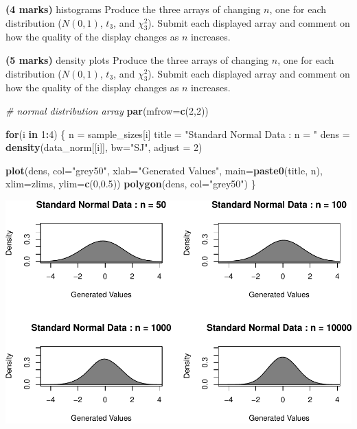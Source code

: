 \documentclass[9pt,letter]{article}
\newenvironment{Shaded}{\begin{snugshade}}{\end{snugshade}}
\newcommand{\KeywordTok}[1]{\textcolor[rgb]{0.13,0.29,0.53}{\textbf{#1}}}
\newcommand{\DataTypeTok}[1]{\textcolor[rgb]{0.13,0.29,0.53}{#1}}
\newcommand{\DecValTok}[1]{\textcolor[rgb]{0.00,0.00,0.81}{#1}}
\newcommand{\FloatTok}[1]{\textcolor[rgb]{0.00,0.00,0.81}{#1}}
\newcommand{\StringTok}[1]{\textcolor[rgb]{0.31,0.60,0.02}{#1}}
\newcommand{\CommentTok}[1]{\textcolor[rgb]{0.56,0.35,0.01}{\textit{#1}}}
\newcommand{\ControlFlowTok}[1]{\textcolor[rgb]{0.13,0.29,0.53}{\textbf{#1}}}
\newcommand{\OperatorTok}[1]{\textcolor[rgb]{0.81,0.36,0.00}{\textbf{#1}}}
\newcommand{\NormalTok}[1]{#1}
\begin{document}
\item 

\textbf{(4 marks)} histograms Produce the three arrays of changing
\(n\), one for each distribution (\(N(0,1)\), \(t_3\), and
\(\chi^2_3\)). Submit each displayed array and comment on how the
quality of the display changes as \(n\) increases.

\item 

\textbf{(5 marks)} density plots Produce the three arrays of changing
\(n\), one for each distribution (\(N(0,1)\), \(t_3\), and
\(\chi^2_3\)). Submit each displayed array and comment on how the
quality of the display changes as \(n\) increases.

\begin{Shaded}
\begin{Highlighting}[]
\CommentTok{# normal distribution array}
\KeywordTok{par}\NormalTok{(}\DataTypeTok{mfrow=}\KeywordTok{c}\NormalTok{(}\DecValTok{2}\NormalTok{,}\DecValTok{2}\NormalTok{))}

\ControlFlowTok{for}\NormalTok{(i }\ControlFlowTok{in} \DecValTok{1}\OperatorTok{:}\DecValTok{4}\NormalTok{) \{}
\NormalTok{  n =}\StringTok{ }\NormalTok{sample_sizes[i]}
\NormalTok{  title =}\StringTok{ "Standard Normal Data : n = "}
\NormalTok{  dens =}\StringTok{ }\KeywordTok{density}\NormalTok{(data_norm[[i]], }\DataTypeTok{bw=}\StringTok{"SJ"}\NormalTok{, }\DataTypeTok{adjust =} \DecValTok{2}\NormalTok{)}
    
  \KeywordTok{plot}\NormalTok{(dens, }\DataTypeTok{col=}\StringTok{"grey50"}\NormalTok{, }
       \DataTypeTok{xlab=}\StringTok{"Generated Values"}\NormalTok{,}
       \DataTypeTok{main=}\KeywordTok{paste0}\NormalTok{(title, n),}
       \DataTypeTok{xlim=}\NormalTok{zlims, }\DataTypeTok{ylim=}\KeywordTok{c}\NormalTok{(}\DecValTok{0}\NormalTok{,}\FloatTok{0.5}\NormalTok{))}
  \KeywordTok{polygon}\NormalTok{(dens, }\DataTypeTok{col=}\StringTok{"grey50"}\NormalTok{)}
\NormalTok{\}}
\end{Highlighting}
\end{Shaded}

\includegraphics{a3_solutions_files/figure-latex/unnamed-chunk-9-1.pdf}
\end{document}
